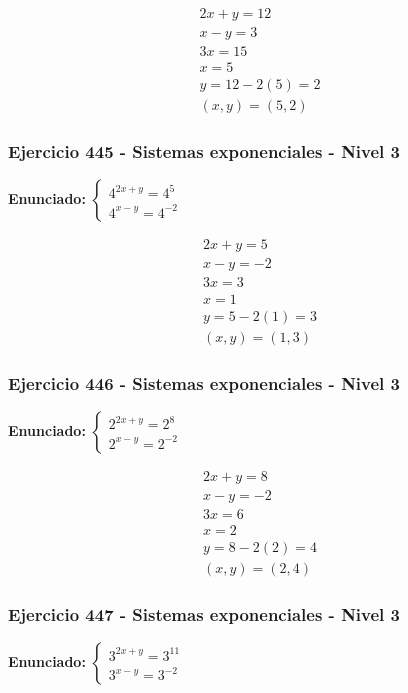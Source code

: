 \documentclass[12pt,a4paper]{article}
\begin{document}
\[
\begin{aligned}
2x+y=12\\
x-y=3\\
3x=15\\
x=5\\
y=12-2(5)=2\\
\boxed{(x,y)=(5,2)}
\end{aligned}
\]


\subsubsection*{Ejercicio 445 - Sistemas exponenciales - Nivel 3}
\textbf{Enunciado:} \(\begin{cases} 4^{2x+y}=4^{5}\\ 4^{x-y}=4^{-2}\end{cases}\)

\[
\begin{aligned}
2x+y=5\\
x-y=-2\\
3x=3\\
x=1\\
y=5-2(1)=3\\
\boxed{(x,y)=(1,3)}
\end{aligned}
\]


\subsubsection*{Ejercicio 446 - Sistemas exponenciales - Nivel 3}
\textbf{Enunciado:} \(\begin{cases} 2^{2x+y}=2^{8}\\ 2^{x-y}=2^{-2}\end{cases}\)

\[
\begin{aligned}
2x+y=8\\
x-y=-2\\
3x=6\\
x=2\\
y=8-2(2)=4\\
\boxed{(x,y)=(2,4)}
\end{aligned}
\]


\subsubsection*{Ejercicio 447 - Sistemas exponenciales - Nivel 3}
\textbf{Enunciado:} \(\begin{cases} 3^{2x+y}=3^{11}\\ 3^{x-y}=3^{-2}\end{cases}\)
\end{document}
